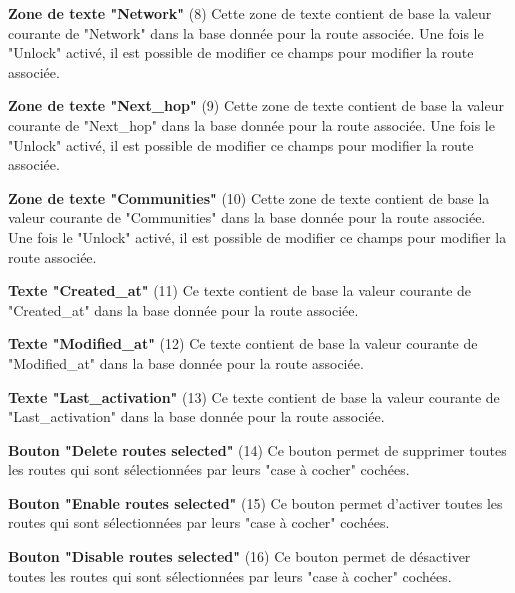 \textbf{Zone de texte "Network"} (8)\newline
Cette zone de texte contient de base la valeur courante de "Network" dans la base donnée pour la route associée. Une fois le "Unlock" activé, il est possible de modifier ce champs pour modifier la route associée.\newline

\textbf{Zone de texte "Next\_hop"} (9)\newline
Cette zone de texte contient de base la valeur courante de "Next\_hop" dans la base donnée pour la route associée. Une fois le "Unlock" activé, il est possible de modifier ce champs pour modifier la route associée.\newline

\textbf{Zone de texte "Communities"} (10)\newline
Cette zone de texte contient de base la valeur courante de "Communities" dans la base donnée pour la route associée. Une fois le "Unlock" activé, il est possible de modifier ce champs pour modifier la route associée.\newline

\textbf{Texte "Created\_at"} (11)\newline
Ce texte contient de base la valeur courante de "Created\_at" dans la base donnée pour la route associée.\newline

\textbf{Texte "Modified\_at"} (12)\newline
Ce texte contient de base la valeur courante de "Modified\_at" dans la base donnée pour la route associée.\newline

\textbf{Texte "Last\_activation"} (13)\newline
Ce texte contient de base la valeur courante de "Last\_activation" dans la base donnée pour la route associée.\newline

\textbf{Bouton "Delete routes selected"} (14)\newline
Ce bouton permet de supprimer toutes les routes qui sont sélectionnées par leurs "case à cocher" cochées.\newline

\textbf{Bouton "Enable routes selected"} (15)\newline
Ce bouton permet d'activer toutes les routes qui sont sélectionnées par leurs "case à cocher" cochées.\newline

\textbf{Bouton "Disable routes selected"} (16)\newline
Ce bouton permet de désactiver toutes les routes qui sont sélectionnées par leurs "case à cocher" cochées.\newline

